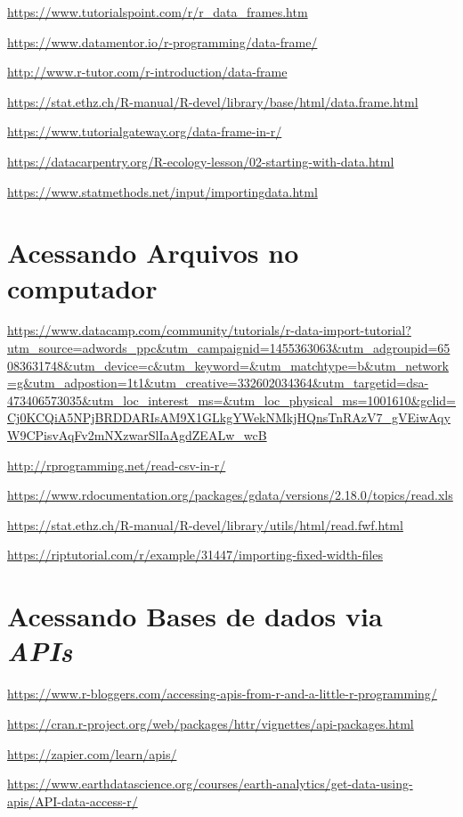 \documentclass[12pt,a4paper,oneside]{erdc}
\begin{document}
\url{https://www.tutorialspoint.com/r/r_data_frames.htm}

\url{https://www.datamentor.io/r-programming/data-frame/}

\url{http://www.r-tutor.com/r-introduction/data-frame}

\url{https://stat.ethz.ch/R-manual/R-devel/library/base/html/data.frame.html}

\url{https://www.tutorialgateway.org/data-frame-in-r/}

\url{https://datacarpentry.org/R-ecology-lesson/02-starting-with-data.html}

\url{https://www.statmethods.net/input/importingdata.html}

\section{Acessando Arquivos no computador}

\url{https://www.datacamp.com/community/tutorials/r-data-import-tutorial?utm_source=adwords_ppc&utm_campaignid=1455363063&utm_adgroupid=65083631748&utm_device=c&utm_keyword=&utm_matchtype=b&utm_network=g&utm_adpostion=1t1&utm_creative=332602034364&utm_targetid=dsa-473406573035&utm_loc_interest_ms=&utm_loc_physical_ms=1001610&gclid=Cj0KCQiA5NPjBRDDARIsAM9X1GLkgYWekNMkjHQnsTnRAzV7_gVEiwAqyW9CPisvAqFv2mNXzwarSlIaAgdZEALw_wcB}

\url{http://rprogramming.net/read-csv-in-r/}

\url{https://www.rdocumentation.org/packages/gdata/versions/2.18.0/topics/read.xls}

\url{https://stat.ethz.ch/R-manual/R-devel/library/utils/html/read.fwf.html}

\url{https://riptutorial.com/r/example/31447/importing-fixed-width-files}


\section{Acessando Bases de dados via \textit{APIs}}

\url{https://www.r-bloggers.com/accessing-apis-from-r-and-a-little-r-programming/}

\url{https://cran.r-project.org/web/packages/httr/vignettes/api-packages.html}

\url{https://zapier.com/learn/apis/}

\url{https://www.earthdatascience.org/courses/earth-analytics/get-data-using-apis/API-data-access-r/}
\end{document}
